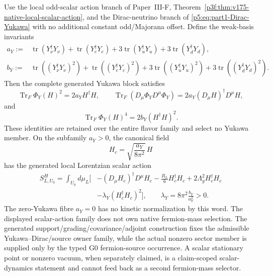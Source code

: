 \documentclass[12pt,a4paper]{article}
\begin{document}
\begin{corollary}
\label{p5:cor:v175-yukawa-scalar-action-family}
Use the local odd-scalar action branch of
Paper~III-F, Theorem~\ref{p3f:thm:v175-native-local-scalar-action}, and the
Dirac-neutrino branch of \eqref{p5:eq:part1-Dirac-Yukawa} with no additional
constant odd/Majorana offset.  Define the weak-basis invariants
\[
\begin{aligned}
 a_Y:={}&\operatorname{tr}(Y_\nu^\dagger Y_\nu)
       +\operatorname{tr}(Y_e^\dagger Y_e)
       +3\operatorname{tr}(Y_u^\dagger Y_u)
       +3\operatorname{tr}(Y_d^\dagger Y_d),\\
 b_Y:={}&\operatorname{tr}\!\left((Y_\nu^\dagger Y_\nu)^2\right)
       +\operatorname{tr}\!\left((Y_e^\dagger Y_e)^2\right)
       +3\operatorname{tr}\!\left((Y_u^\dagger Y_u)^2\right)
       +3\operatorname{tr}\!\left((Y_d^\dagger Y_d)^2\right).
\end{aligned}
\]
Then the complete generated Yukawa block satisfies
\[
 \operatorname{Tr}_F\Phi_Y(H)^2=2a_YH^\dagger H,
 \qquad
 \operatorname{Tr}_F(D_\mu\Phi_YD^\mu\Phi_Y)
 =2a_Y(D_\mu H)^\dagger D^\mu H,
\]
and
\[
 \operatorname{Tr}_F\Phi_Y(H)^4=2b_Y(H^\dagger H)^2.
\]
These identities are retained over the entire flavor family and select no
Yukawa member.  On the subfamily \(a_Y>0\), the canonical field
\[
 H_c=\sqrt{\frac{a_Y}{8\pi^2}}\,H
\]
has the generated local Lorentzian scalar action
\[
\begin{aligned}
 S_{L,U_0}^{H}=\int_{U_0}d\mu_L\bigg[&
 -(D_\mu H_c)^\dagger D^\mu H_c
 -\frac{R_L}{6}H_c^\dagger H_c
 +2\Lambda_g^2H_c^\dagger H_c\\
 &-\lambda_Y(H_c^\dagger H_c)^2\bigg],
 \qquad
 \lambda_Y=8\pi^2\frac{b_Y}{a_Y^2}>0.
\end{aligned}
\]
The zero-Yukawa fibre \(a_Y=0\) has no kinetic normalization by this word.
The displayed scalar-action family does not own native fermion-mass
selection.  The generated support/grading/covariance/adjoint construction fixes
the admissible Yukawa--Dirac/source owner family, while the actual nonzero
sector member is supplied only by the typed G0 fermion-source occurrence.
A scalar stationary point or nonzero vacuum, when separately claimed, is a
claim-scoped scalar-dynamics statement and cannot feed back as a second
fermion-mass selector.
\end{corollary}
\end{document}

